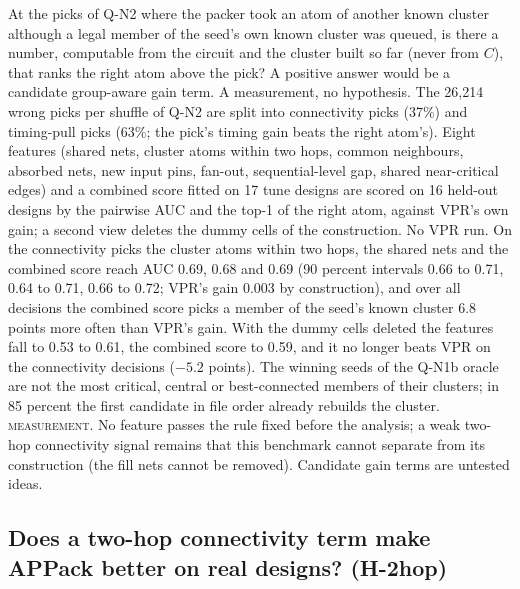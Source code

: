  At the picks of Q-N2 where the packer took an atom of another known cluster although a legal member of the seed's own known cluster was queued, is there a number, computable from the circuit and the cluster built so far (never from $C$), that ranks the right atom above the pick? A positive answer would be a candidate group-aware gain term. A measurement, no hypothesis.
 The 26{,}214 wrong picks per shuffle of Q-N2 are split into connectivity picks (37\%) and timing-pull picks (63\%; the pick's timing gain beats the right atom's). Eight features (shared nets, cluster atoms within two hops, common neighbours, absorbed nets, new input pins, fan-out, sequential-level gap, shared near-critical edges) and a combined score fitted on 17 tune designs are scored on 16 held-out designs by the pairwise AUC and the top-1 of the right atom, against VPR's own gain; a second view deletes the dummy cells of the construction. No VPR run.
 On the connectivity picks the cluster atoms within two hops, the shared nets and the combined score reach AUC 0.69, 0.68 and 0.69 (90 percent intervals 0.66 to 0.71, 0.64 to 0.71, 0.66 to 0.72; VPR's gain 0.003 by construction), and over all decisions the combined score picks a member of the seed's known cluster 6.8 points more often than VPR's gain. With the dummy cells deleted the features fall to 0.53 to 0.61, the combined score to 0.59, and it no longer beats VPR on the connectivity decisions ($-5.2$ points). The winning seeds of the Q-N1b oracle are not the most critical, central or best-connected members of their clusters; in 85 percent the first candidate in file order already rebuilds the cluster.
 \textsc{measurement}. No feature passes the rule fixed before the analysis; a weak two-hop connectivity signal remains that this benchmark cannot separate from its construction (the fill nets cannot be removed). Candidate gain terms are untested ideas.

\subsection{Does a two-hop connectivity term make APPack better on real designs? (H-2hop)}
\label{sec:e-2hop}

